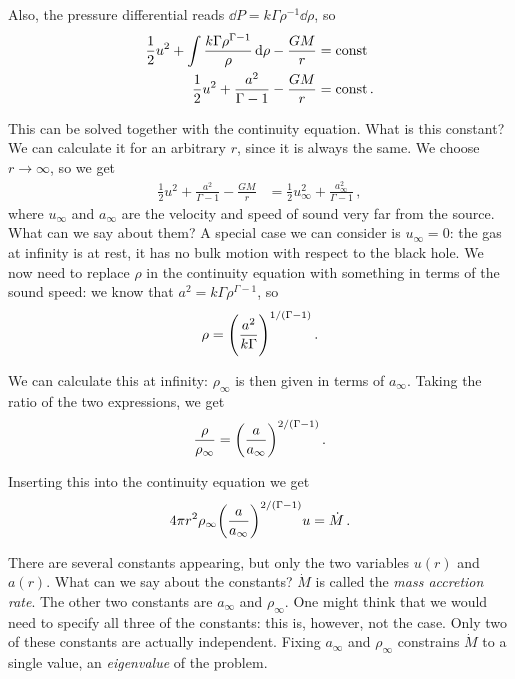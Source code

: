 \documentclass[main.tex]{subfiles}
\begin{document}
Also, the pressure differential reads \(\dd{P} = k \Gamma \rho^{-1} \dd{\rho }\), so 
%
\begin{align}
\frac{1}{2} u^2 + \int \frac{k \Gamma \rho^{\Gamma -1}}{\rho } \dd{\rho } - \frac{GM}{r} &= \text{const}  \\
\frac{1}{2} u^2 + \frac{a^2}{\Gamma -1} - \frac{GM}{r} &= \text{const}
\,.
\end{align}

This can be solved together with the continuity equation. What is this constant? We can calculate it for an arbitrary \(r\), since it is always the same. We choose \(r \to \infty \), so we get 
%
\begin{align}
\frac{1}{2} u^2 + \frac{a^2}{\Gamma -1} - \frac{GM}{r} 
&= \frac{1}{2} u^2_{\infty } + \frac{a^2_{\infty }}{\Gamma -1} 
\,,
\end{align}
%
where \(u_\infty \) and \(a_\infty \) are the velocity and speed of sound very far from the source. What can we say about them? 
A special case we can consider is \(u_\infty  = 0\): the gas at infinity is at rest, it has no bulk motion with respect to the black hole. 
We now need to replace \(\rho \) in the continuity equation with something in terms of the sound speed: we know that \(a^2 = k \Gamma \rho^{\Gamma -1}\), so 
%
\begin{align}
\rho = \qty(\frac{a^2}{k \Gamma })^{1 / (\Gamma -1)}
\,.
\end{align}

We can calculate this at infinity: \(\rho _\infty \) is then given in terms of \(a_\infty \). 
Taking the ratio of the two expressions, we get 
%
\begin{align}
\frac{\rho }{\rho _\infty } = \qty(\frac{a}{a_\infty })^{2 / (\Gamma -1)}
\,.
\end{align}

Inserting this into the continuity equation we get 
%
\begin{align}
4 \pi r^2 \rho _\infty \qty(\frac{a}{a_\infty })^{ 2 / (\Gamma -1)} u = \dot{M}
\,.
\end{align}

There are several constants appearing, but only the two variables \(u(r)\) and \(a(r)\). 
What can we say about the constants? \(\dot{M}\) is called the \emph{mass accretion rate}. The other two constants are \(a_\infty \) and \(\rho _\infty\). 
One might think that we would need to specify all three of the constants: this is, however, not the case. Only two of these constants are actually independent. Fixing \(a_\infty \) and \(\rho _\infty \) constrains \(\dot{M}\) to a single value, an \emph{eigenvalue} of the problem.
\end{document}
